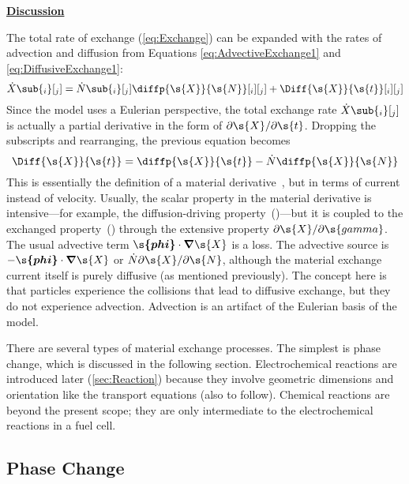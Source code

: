 \noindent\underline{\textbf{Discussion}}
\label{mark:TransportDiscussion}


The total rate of exchange (\autoref{eq:Exchange}) can be expanded with the rates of advection and diffusion from Equations \ref{eq:AdvectiveExchange1} and \ref{eq:DiffusiveExchange1}:
\begin{equation}
  \dot{X}\sub{_i}[_j] = \dot{N}\sub{_i}[_j]\diffp{\s{X}}{\s{N}}[_i][_j] + \Diff{\s{X}}{\s{t}}[_i][_j]
\end{equation}
Since the model uses a Eulerian perspective, the total exchange rate $\dot{X}\sub{_i}[_j]$ is actually a partial derivative in the form of $\partial\s{X}/\partial\s{t}$.  Dropping the subscripts and rearranging, the previous equation becomes\label{mark:MaterialDeriv}
\begin{equation}
  \Diff{\s{X}}{\s{t}} = \diffp{\s{X}}{\s{t}} - \dot{N}\diffp{\s{X}}{\s{N}}
\end{equation}
This is essentially the definition of a material derivative~\cite{Bird2007}, but in terms of current instead of velocity.  Usually, the scalar property in the material derivative is intensive---for example, the diffusion-driving property~()---but it is coupled to the exchanged property~() through the extensive property $\partial\s{X}/\partial\s{gamma}$.  The usual advective term $\boldsymbol{\s{phi}}\cdot\boldsymbol{\nabla}\s{X}$ is a loss.  The advective source is $-\boldsymbol{\s{phi}}\cdot\boldsymbol{\nabla}\s{X}$ or $\dot{N}\partial\s{X}/\partial\s{N}$, although the material exchange current itself is purely diffusive (as mentioned previously).  The concept here is that particles experience the collisions that lead to diffusive exchange, but they do not experience advection.  Advection is an artifact of the Eulerian basis of the model.

There are several types of material exchange processes.  The simplest is phase change, which is discussed in the following section.  Electrochemical reactions are introduced later (\autoref{sec:Reaction}) because they involve geometric dimensions and orientation like the transport equations (also to follow).  Chemical reactions are beyond the present scope; they are only intermediate to the electrochemical reactions in a fuel cell.


\subsection{Phase Change}
\label{sec:PhaseChange}


